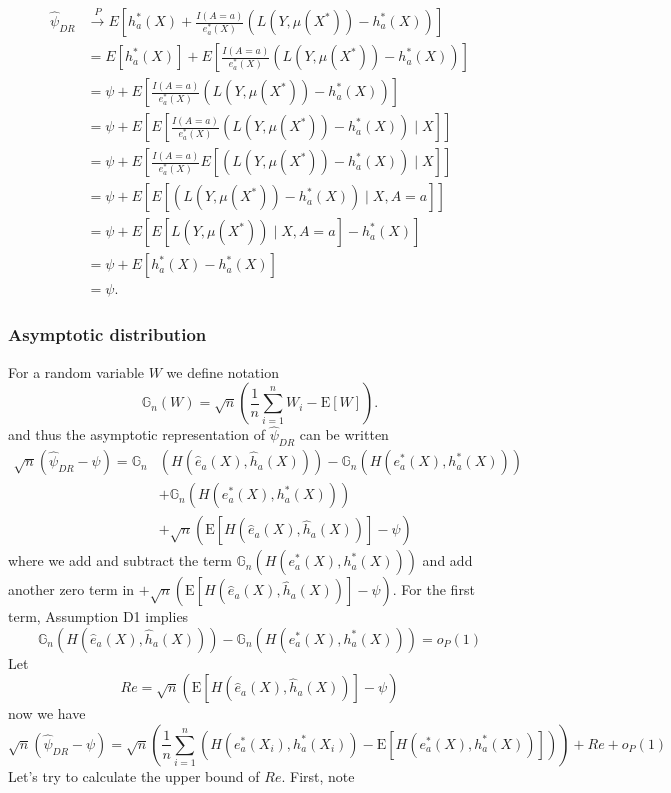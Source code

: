 $$
\begin{aligned}
\widehat{\psi}_{DR} & \stackrel{P}{\rightarrow}  E\left[h^*_a(X)+\frac{I(A = a)}{e^*_a(X)}\left(L\left(Y, \mu\left(X^*\right)\right)-h^*_a(X)\right)\right] \\
&= E\left[h^*_a(X)\right]+E\left[\frac{I(A = a)}{e^*_a(X)}\left(L\left(Y, \mu\left(X^*\right)\right)-h^*_a(X)\right)\right] \\
& =\psi+E\left[\frac{I(A = a)}{e^*_a(X)}\left(L\left(Y, \mu\left(X^*\right)\right)-h^*_a(X)\right)\right] \\
& =\psi+E\left[E\left[\frac{I(A = a)}{e^*_a(X)}\left(L\left(Y, \mu\left(X^*\right)\right)-h^*_a(X)\right) \mid X \right]\right] \\
& =\psi+E\left[\frac{I(A = a)}{e^*_a(X)} E\left[\left(L\left(Y, \mu\left(X^*\right)\right)-h^*_a(X)\right) \mid X \right]\right] \\
& =\psi+E\left[E\left[\left(L\left(Y, \mu\left(X^*\right)\right)-h^*_a(X)\right) \mid X, A=a \right]\right] \\
& =\psi+E\left[E\left[L\left(Y, \mu\left(X^*\right)\right) \mid X, A=a  \right] -h^*_a(X) \right] \\
& =\psi+E\left[h^*_a(X) -h^*_a(X) \right] \\
& =\psi .
\end{aligned}
$$

\subsubsection{Asymptotic distribution}

For a random variable $W$ we define notation
$$
\mathbb{G}_n(W)=\sqrt{n}\left(\frac{1}{n} \sum_{i=1}^n W_i-\mathrm{E}[W]\right) .
$$
and thus the asymptotic representation of $\widehat{\psi}_{DR}$ can be written
$$
\begin{aligned}
\sqrt{n}\left(\widehat{\psi}_{D R}-\psi\right)=\mathbb{G}_n &(H(\widehat{e}_a(X), \widehat{h}_a(X)))-\mathbb{G}_n\left(H\left(e^*_a(X), h^*_a(X)\right)\right) \\
& +\mathbb{G}_n\left(H\left(e^*_a(X), h^*_a(X)\right)\right) \\
& +\sqrt{n}(\mathrm{E}[H(\widehat{e}_a(X), \widehat{h}_a(X))]-\psi)
\end{aligned}
$$
where we add and subtract the term $\mathbb{G}_n\left(H\left(e^*_a(X), h^*_a(X)\right)\right)$ and add another zero term in $+\sqrt{n}(\mathrm{E}[H(\widehat{e}_a(X), \widehat{h}_a(X))]-\psi)$. For the first term, Assumption D1 implies
$$
\mathbb{G}_n(H(\widehat{e}_a(X), \widehat{h}_a(X)))-\mathbb{G}_n\left(H\left(e^*_a(X), h^*_a(X)\right)\right)=o_P(1)
$$
Let 
$$
Re=\sqrt{n}(\mathrm{E}[H(\widehat{e}_a(X), \widehat{h}_a(X))]-\psi)
$$
now we have
$$
\sqrt{n}\left(\widehat{\psi}_{DR}-\psi\right)=\sqrt{n}\left(\frac{1}{n} \sum_{i=1}^n\left(H\left(e^*_a(X_i), h^*_a(X_i)\right)-\mathrm{E}\left[H\left(e^*_a(X), h^*_a(X)\right)\right]\right)\right)+R e+o_P(1)
$$
Let's try to calculate the upper bound of $Re$. First, note

